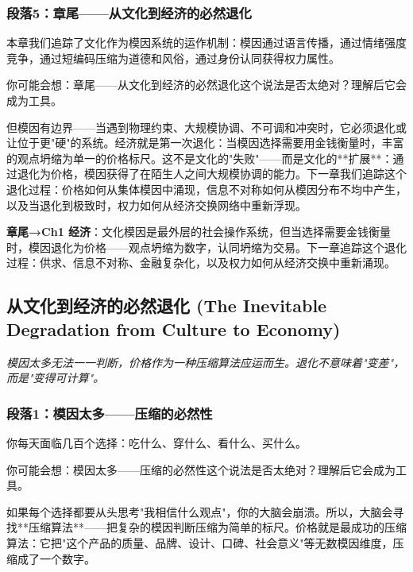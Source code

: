 \documentclass[a4paper,12pt]{book}
\newenvironment{motivation}{\begin{tcolorbox}[colback=gray!10,colframe=gray!60,title=\textit{本章动机 (Motivation)},fonttitle=\bfseries,arc=0mm,leftrule=3mm]\small\itshape}{\end{tcolorbox}}
\begin{document}
\begin{motivation}
\begin{motivation}
\begin{motivation}
	\subsubsection*{段落5：章尾——从文化到经济的必然退化}
	本章我们追踪了文化作为模因系统的运作机制：模因通过语言传播，通过情绪强度竞争，通过短编码压缩为道德和风俗，通过身份认同获得权力属性。
	\begin{tcolorbox}[colback=yellow!5, title=\textit{读者行为预测}]
		你可能会想：章尾——从文化到经济的必然退化这个说法是否太绝对？理解后它会成为工具。
	\end{tcolorbox}

但模因有边界——当遇到物理约束、大规模协调、不可调和冲突时，它必须退化或让位于更"硬"的系统。经济就是第一次退化：当模因选择需要用金钱衡量时，丰富的观点坍缩为单一的价格标尺。这不是文化的"失败"——而是文化的**扩展**：通过退化为价格，模因获得了在陌生人之间大规模协调的能力。下一章我们追踪这个退化过程：价格如何从集体模因中涌现，信息不对称如何从模因分布不均中产生，以及当退化到极致时，权力如何从经济交换网络中重新浮现。

	\textbf{章尾→Ch1 经济}：文化模因是最外层的社会操作系统，但当选择需要金钱衡量时，模因退化为价格——观点坍缩为数字，认同坍缩为交易。下一章追踪这个退化过程：供求、信息不对称、金融复杂化，以及权力如何从经济交换中重新涌现。



	\subsection{从文化到经济的必然退化 (The Inevitable Degradation from Culture to Economy)}
	\begin{motivation}
		模因太多无法一一判断，价格作为一种压缩算法应运而生。退化不意味着"变差"，而是"变得可计算"。
	\end{motivation}

	\subsubsection*{段落1：模因太多——压缩的必然性}
	你每天面临几百个选择：吃什么、穿什么、看什么、买什么。
	\begin{tcolorbox}[colback=yellow!5, title=\textit{读者行为预测}]
		你可能会想：模因太多——压缩的必然性这个说法是否太绝对？理解后它会成为工具。
	\end{tcolorbox}

如果每个选择都要从头思考"我相信什么观点"，你的大脑会崩溃。所以，大脑会寻找**压缩算法**——把复杂的模因判断压缩为简单的标尺。价格就是最成功的压缩算法：它把"这个产品的质量、品牌、设计、口碑、社会意义"等无数模因维度，压缩成了一个数字。


\end{motivation}
\end{motivation}
\end{motivation}
\end{document}
